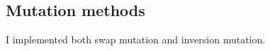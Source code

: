 \documentclass[11pt]{scrartcl} %
\begin{document}
\subsection{Mutation methods}
I implemented both swap mutation and inversion mutation.





% 
% 

\printbibliography
\end{document}
